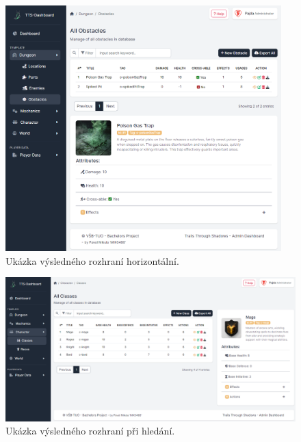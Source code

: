 \begin{figure}[ht]
    \centering
    \includegraphics[width=0.95\textwidth]{figures/dashboardTableHorizontal}
    \caption{Ukázka výsledného rozhraní horizontální.}
    \label{fig:interfaceScreenshotsTableHorizontal}
\end{figure}

\begin{figure}
    \centering
    \includegraphics[width=1.0\textwidth]{figures/dashboardTable}
    \caption{Ukázka výsledného rozhraní při hledání.}
    \label{fig:interfaceScreenshotsTable}
\end{figure}

